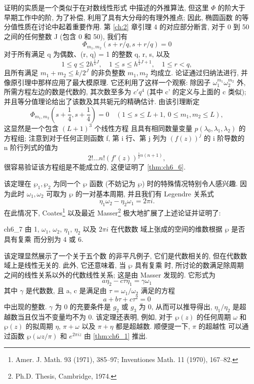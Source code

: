证明的实质是一个类似于在对数线性形式 中描述的外推算法, 但这里 $\Phi$ 的阶大于早期工作中的阶, 为了补偿, 利用了具有大分母的有理外推点; 因此, 椭圆函数 的等分值性质在讨论中起着重要作用. 第 \ref{ch:2} 章引理 4 的对应部分断言, 对于 0 到 50 之间的任何整数 J (包含 0 和 50), 我们有
\[\Phi_{m_1, m_2}(s + r/q, s + r/q) = 0\]
对于所有满足 q 为偶数、(r, q) = 1 的整数 q, r, s, 以及
\[1\leqslant q\leqslant 2h^{\frac{1}{4}J},\quad 1\leqslant s\leqslant h^{\frac{1}{4}J+1},\quad 1\leqslant r< q,\]
且所有满足 $m_1 + m_2 \leq k/2^J$ 的非负整数 $m_1, m_2$ 均成立. 论证通过归纳法进行, 并像原引理中那样应用了最大模原理. 它还利用了这样一个观察: 除因子 $\omega_1^{m_1}\omega_2^{m_2}$ 外, 所需方程左边的数是代数的, 其次数至多为 $c'q^4$ (其中 c' 的定义与上面的 c 类似); 并且等分值理论给出了该数及其共轭元的精确估计. 由该引理断定
\[\Phi_{m_1, m_2}(s+\frac{1}{4}, s+\frac{1}{4}) = 0 \quad (1 \le s \le L+1, \ 0 \le m_1, m_2 \le L),\]
这显然是一个包含 $(L+1)^3$ 个线性方程 且具有相同数量变量 $p(\lambda_0, \lambda_1, \lambda_2)$ 的方程组; 注意到对于任何正则函数 f, 第 i 行、第 j 列为 $(f(z))^j$ 的 i 阶导数的 n 阶行列式的值为
\[2! \dots n! (f'(z))^{\frac{1}{2}n(n+1)},\]
很容易验证该方程组是不能成立的, 这便证明了 \autoref{thm:ch6_6}.

该定理在 $\wp_1, \wp_2$ 为同一个 $\wp$ 函数 (不妨记为 $\wp$) 时的特殊情况特别令人感兴趣. 因为此时 $\omega_1, \omega_2$ 可取为 $\wp$ 的一对基本周期, 并且我们有 Legendre 关系式
\[\eta_1\omega_2-\eta_2\omega_1=2\pi i.\]
在此情况下, Coates\footnote{Amer. J. Math. 93 (1971), 385--97; Inventiones Math. 11 (1970), 167--82.} 以及最近 Masser\footnote{Ph.D. Thesis, Cambridge, 1974.} 极大地扩展了上述论证并证明了:

\begin{mythm}{}{ch6_7}
由 1, $\omega_1$, $\omega_2$, $\eta_1$, $\eta_2$ 以及 $2\pi i$ 在代数数 域上张成的空间的维数根据 $\wp$ 是否具有复乘 而分别为 4 或 6.
\end{mythm}

该定理显然展示了一个关于五个数 的非平凡例子, 它们是代数相关的, 但在代数数 域上是线性无关的. 此外, 它还意味着, 当 $\wp$ 具有复乘 时, 所讨论的数满足除周期之间的线性关系以外的代数线性关系; 这是由 Masser 发现的. 它形式为
\[a\eta_{2}-c\tau\eta_{1}=\gamma\omega_{1}\]
其中 $\gamma$ 是代数数, 且 a, c 是满足由 $\tau = \omega_1/\omega_2$ 满足的方程
\[a + b\tau + c\tau^2 = 0\]
中出现的整数. $\gamma$ 为 0 的充要条件是 $g_2$ 或 $g_3$ 为 0, 从而可以推导得出, $\eta_1/\eta_2$ 是超越数当且仅当不变量均不为 0. 该定理还表明, 例如, 对于 $\wp(z)$ 的任何周期 $\omega$ 和 $\wp(z)$ 的拟周期 $\eta$, $\pi + \omega$ 以及 $\pi + \eta$ 都是超越数. 顺便提一下, $\pi$ 的超越性 可以通过函数 $\wp(\omega z/\pi)$ 和 $e^{2\pi iz}$ 由 \autoref{thm:ch6_1} 推出.

